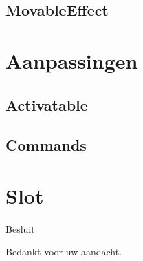 \documentclass[t]{beamer}
\begin{document}
\subsection{MovableEffect}


\section{Aanpassingen}

\subsection{Activatable}
\subsection{Commands}



\section{Slot}
\begin{frame}{Besluit}
\vspace{0.8in}
\begin{center}
Bedankt voor uw aandacht.
\end{center}
\end{frame}
\end{document}

